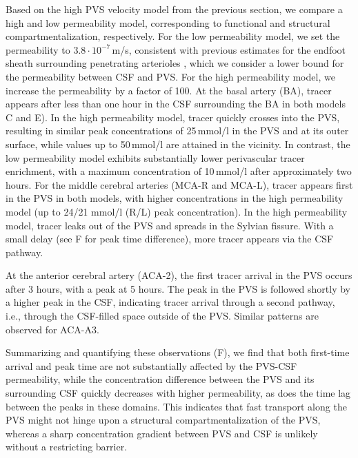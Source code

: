 \documentclass[fleqn,10pt]{wlscirep}
\begin{document}
Based on the high PVS velocity model from the previous section, we compare a high and low permeability model, corresponding to functional and structural compartmentalization, respectively. For the low permeability model, we set the permeability to $3.8 \cdot 10^{-7}\,$m/s, consistent with previous estimates for the endfoot sheath surrounding penetrating arterioles \cite{koch2023estimates}, which we consider a lower bound for the permeability between CSF and PVS. For the high permeability model, we increase the permeability by a factor of 100.
At the basal artery (BA), tracer appears after less than one hour in the CSF surrounding the BA in both models C and E). In the high permeability model, tracer quickly crosses into the PVS, resulting in similar peak concentrations of 25\,mmol/l in the PVS and at its outer surface, while values up to 50\,mmol/l are attained in the vicinity. In contrast, the low permeability model exhibits substantially lower perivascular tracer enrichment, with a maximum concentration of 10\,mmol/l after approximately two hours.
For the middle cerebral arteries (MCA-R and MCA-L), tracer appears first in the PVS in both models, with higher concentrations in the high permeability model (up to 24/21 mmol/l (R/L) peak concentration). In the high permeability model, tracer leaks out of the PVS and spreads in the Sylvian fissure. With a small delay (see F for peak time difference), more tracer appears via the CSF pathway.

At the anterior cerebral artery (ACA-2), the first tracer arrival in the PVS occurs after 3 hours, with a peak at 5 hours. The peak in the PVS is followed shortly by a higher peak in the CSF, indicating tracer arrival through a second pathway, i.e., through the CSF-filled space outside of the PVS. Similar patterns are observed for ACA-A3.

Summarizing and quantifying these observations (F), we find that both first-time arrival and peak time are not substantially affected by the PVS-CSF permeability, while the concentration difference between the PVS and its surrounding CSF quickly decreases with higher permeability, as does the time lag between the peaks in these domains. 
This indicates that fast transport along the PVS might not hinge upon a structural compartmentalization of the PVS, whereas a sharp concentration gradient between PVS and CSF is unlikely without a restricting barrier.
\end{document}
